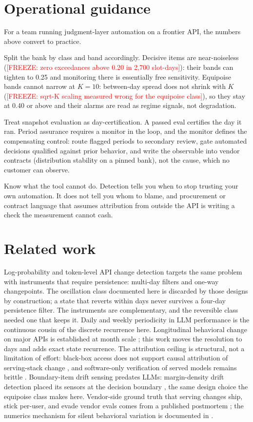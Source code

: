 \documentclass[conference]{IEEEtran}
\newcommand{\freeze}[1]{\textcolor{red}{[FREEZE: #1]}}
\begin{document}
\section{Operational guidance}

For a team running judgment-layer automation on a frontier API, the
numbers above convert to practice.

Split the bank by class and band accordingly. Decisive items are
near-noiseless (\freeze{zero exceedances above 0.20 in 2,700
slot-days}): their bands can tighten to 0.25 and monitoring there
is essentially free sensitivity. Equipoise bands cannot narrow at
$K=10$: between-day spread does not shrink with $K$ (\freeze{sqrt-K
scaling measured wrong for the equipoise class}), so they stay at
0.40 or above and their alarms are read as regime signals, not
degradation.

Treat snapshot evaluation as day-certification. A passed eval
certifies the day it ran. Period assurance requires a monitor in
the loop, and the monitor defines the compensating control: route
flagged periods to secondary review, gate automated decisions
qualified against prior behavior, and write the observable into
vendor contracts (distribution stability on a pinned bank), not the
cause, which no customer can observe.

Know what the tool cannot do. Detection tells you when to stop
trusting your own automation. It does not tell you whom to blame,
and procurement or contract language that assumes attribution from
outside the API is writing a check the measurement cannot cash.

\section{Related work}

Log-probability and token-level API change detection
\cite{chauvin-a,chauvin-b} targets the same problem with
instruments that require persistence: multi-day filters and one-way
changepoints. The oscillation class documented here is discarded by
those designs by construction; a state that reverts within days
never survives a four-day persistence filter. The instruments are
complementary, and the reversible class needed one that keeps it.
Daily and weekly periodicity in LLM performance \cite{tschisgale}
is the continuous cousin of the discrete recurrence here.
Longitudinal behavioral change on major APIs is established at
month scale \cite{chen}; this work moves the resolution to days and
adds exact state recurrence. The attribution ceiling is structural,
not a limitation of effort: black-box access does not support
causal attribution of serving-stack change \cite{casper}, and
software-only verification of served models remains brittle
\cite{cai}. Boundary-item drift sensing predates LLMs:
margin-density drift detection placed its sensors at the decision
boundary \cite{md3}, the same design choice the equipoise class
makes here. Vendor-side ground truth that serving changes ship,
stick per-user, and evade vendor evals comes from a published
postmortem \cite{anthropic-postmortem}; the numerics mechanism for
silent behavioral variation is documented in
\cite{thinking-machines}.
\end{document}
